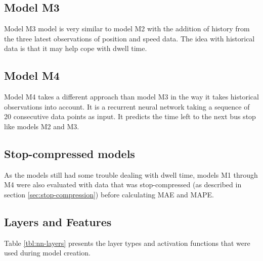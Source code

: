 \subsection{Model M3}\label{M3}
Model M3 model is very similar to model M2 with the addition of history from the three latest observations of position and speed data. The idea with historical data is that it may help cope with dwell time.

\subsection{Model M4}
Model M4 takes a different approach than model M3 in the way it takes historical observations into account. It is a recurrent neural network taking a sequence of 20 consecutive data points as input. It predicts the time left to the next bus stop like models M2 and M3. 

\subsection{Stop-compressed models}
As the models still had some trouble dealing with dwell time, models M1 through M4 were also evaluated with data that was stop-compressed (as described in section \ref{sec:stop-compression}) before calculating MAE and MAPE. 

\subsection{Layers and Features}
Table \ref{tbl:nn-layers} presents the layer types and activation functions that were used during model creation.

